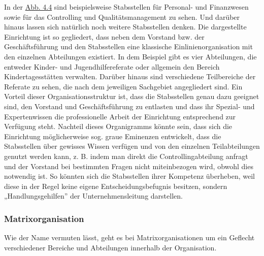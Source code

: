\documentclass[
  letterpaper,
]{book}
\begin{document}
In der \hyperref[figure44]{Abb. 4.4} sind beispielsweise Stabsstellen
für Personal- und Finanzwesen sowie für das Controlling und
Qualitätsmanagement zu sehen. Und darüber hinaus lassen sich natürlich
noch weitere Stabsstellen denken. Die dargestellte Einrichtung ist so
gegliedert, dass neben dem Vorstand bzw. der Geschäftsführung und den
Stabsstellen eine klassische Einlinienorganisation mit den einzelnen
Abteilungen existiert. In dem Beispiel gibt es vier Abteilungen, die
entweder Kinder- und Jugendhilfereferate oder allgemein den Bereich
Kindertagesstätten verwalten. Darüber hinaus sind verschiedene
Teilbereiche der Referate zu sehen, die nach dem jeweiligen Sachgebiet
angegliedert sind. Ein Vorteil dieser Organisationsstruktur ist, dass
die Stabsstellen genau dazu geeignet sind, den Vorstand und
Geschäftsführung zu entlasten und dass ihr Spezial- und Expertenwissen
die professionelle Arbeit der Einrichtung entsprechend zur Verfügung
steht. Nachteil dieses Organigramms könnte sein, dass sich die
Einrichtung möglicherweise sog. graue Eminenzen entwickelt, dass die
Stabsstellen über gewisses Wissen verfügen und von den einzelnen
Teilabteilungen genutzt werden kann, z. B. indem man direkt die
Controllingabteilung anfragt und der Vorstand bei bestimmten Fragen
nicht miteinbezogen wird, obwohl dies notwendig ist. So könnten sich die
Stabsstellen ihrer Kompetenz überheben, weil diese in der Regel keine
eigene Entscheidungsbefugnis besitzen, sondern „Handlungsgehilfen'' der
Unternehmensleitung darstellen.

\subsubsection{Matrixorganisation}\label{matrixorganisation}

Wie der Name vermuten lässt, geht es bei Matrixorganisationen um ein
Geflecht verschiedener Bereiche und Abteilungen innerhalb der
Organisation.
\end{document}
